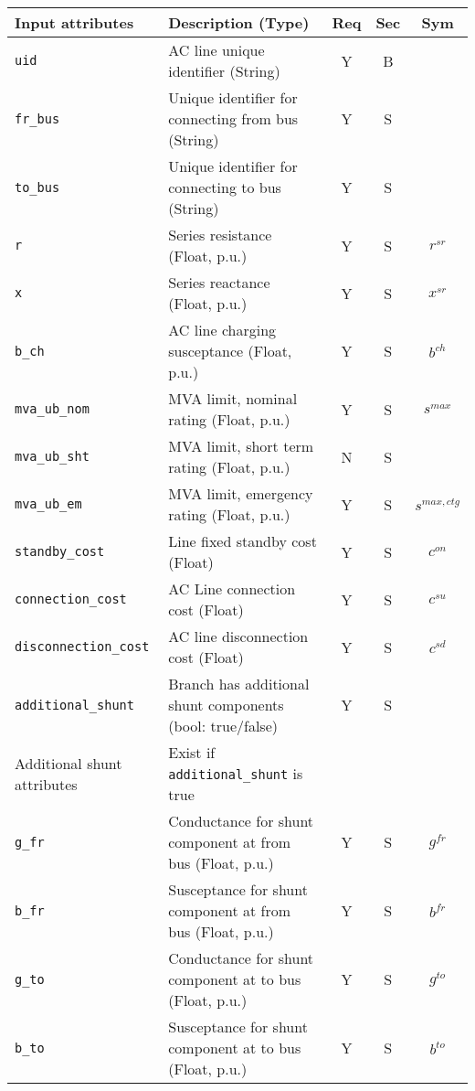 \documentclass{article}
\begin{document}
\begin{center}
\small
\begin{tabular}{ l | l | c | c | c | }
Input attributes & Description (Type)& Req & Sec & Sym\\
\hline
  {\tt uid} & AC line unique identifier (String)& Y & B &  \\
  {\tt fr\_bus} & Unique identifier for connecting from bus (String)& Y & S & \\
  {\tt to\_bus} & Unique identifier for connecting to bus (String)& Y & S & \\
  {\tt r} & Series resistance (Float, p.u.)& Y & S & $r^{sr}$\\
  {\tt x} & Series reactance  (Float, p.u.)& Y & S & $x^{sr}$\\
  {\tt b\_ch} & AC line charging susceptance (Float, p.u.)& Y & S & $b^{ch}$\\    
  {\tt mva\_ub\_nom} & MVA limit, nominal rating (Float, p.u.)& Y & S & $s^{max}$\\
  {\tt mva\_ub\_sht} & MVA limit, short term rating (Float, p.u.)& N & S & \\
  {\tt mva\_ub\_em} & MVA limit, emergency rating (Float, p.u.)& Y & S & $s^{max,ctg}$\\  
  {\tt standby\_cost} & Line fixed standby cost (Float) & Y & S & $c^{on}$\\
  {\tt connection\_cost} &  AC Line connection cost (Float) & Y & S & $c^{su}$\\ 
  {\tt disconnection\_cost} & AC line disconnection cost (Float) & Y & S & $c^{sd}$\\
  {\tt additional\_shunt} & Branch has additional shunt components (bool: true/false)& Y & S & \\
  \hline
  Additional shunt attributes & Exist if {\tt additional\_shunt} is true &  & & \\
  \hline
  {\tt g\_fr} & Conductance for shunt component at from bus (Float, p.u.)& Y & S & $g^{fr}$\\
  {\tt b\_fr} & Susceptance for shunt component at from bus (Float, p.u.)& Y & S & $b^{fr}$\\
  {\tt g\_to} & Conductance for shunt component at to bus (Float, p.u.)& Y & S & $g^{to}$\\
  {\tt b\_to} & Susceptance for shunt component at to bus (Float, p.u.)& Y & S & $b^{to}$\\
  \hline
\end{tabular}
\end{center}
\end{document}
